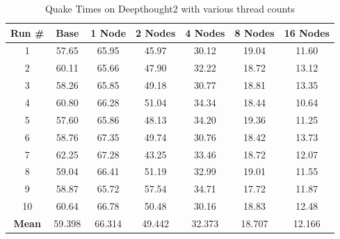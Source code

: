 \documentclass[11pt,letterpaper]{article}
\begin{document}
\begin{table}[h!]
    \renewcommand{\arraystretch}{1.5}
    \centering
\begin{tabular}{ | c || c | c | c | c | c | c | }
	\hline
	\textbf{Run #} & \textbf{Base} & \textbf{1 Node} & \textbf{2 Nodes} & \textbf{4 Nodes} &	 \textbf{8 Nodes} & \textbf{16 Nodes} \\
	\hline
	1 & 57.65 & 65.95 & 45.97 & 30.12 & 19.04 & 11.60 \\
	2 & 60.11 & 65.66 & 47.90 & 32.22 & 18.72 & 13.12 \\
	3 & 58.26 & 65.85 & 49.18 & 30.77 & 18.81 & 13.35 \\
	4 & 60.80 & 66.28 & 51.04 & 34.34 & 18.44 & 10.64 \\
	5 & 57.60 & 65.86 & 48.13 & 34.20 & 19.36 & 11.25 \\
	6 & 58.76 & 67.35 & 49.74 & 30.76 & 18.42 & 13.73 \\
	7 & 62.25 & 67.28 & 43.25 & 33.46 & 18.72 & 12.07 \\
	8 & 59.04 & 66.41 & 51.19 & 32.99 & 19.01 & 11.55 \\
	9 & 58.87 & 65.72 & 57.54 & 34.71 & 17.72 & 11.87 \\
	10 & 60.64 & 66.78 & 50.48 & 30.16 & 18.83 & 12.48 \\
	\hline
	\textbf{Mean} & 59.398 & 66.314 & 49.442 & 32.373 & 18.707 & 12.166 \\
	\hline
\end{tabular}
	\caption{Quake Times on Deepthought2 with various thread counts}
	\label{table:deepthought2-performance}
\end{table}
\end{document}
